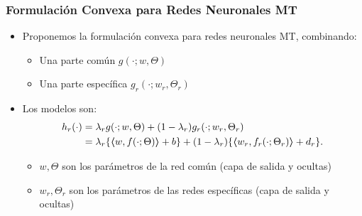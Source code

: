 \documentclass[aspectratio=43]{beamer}
\newcommand{\dotp}[2]{\bm{\left\langle} #1, #2 \bm{\right\rangle}}
\begin{document}
\begin{frame}
      \frametitle{Formulación Convexa para Redes Neuronales MT}

      \begin{itemize}
            \item Proponemos la formulación convexa para redes neuronales MT, combinando:
            \begin{itemize}
                  \item Una parte común $g(\cdot; w, \Theta)$
                  \item Una parte específica $g_r(\cdot; w_r, \Theta_r)$
            \end{itemize}
            \item Los modelos son:
            \begin{equation}
                  \nonumber
                  \begin{aligned}
                      h_r(\cdot) &= \lambda_r g(\cdot; w, \Theta) + (1 - \lambda_r) g_r(\cdot; w_r, \Theta_r)
                     \\&= \lambda_r \lbrace \dotp{w}{f(\cdot; \Theta)} + b \rbrace + (1 - \lambda_r) \lbrace \dotp{w_r}{f_r(\cdot; \Theta_r)} + d_r \rbrace.
                  \end{aligned} 
              \end{equation}
              \begin{itemize}
                  \item $w, \Theta$ son los parámetros de la red común (capa de salida y ocultas)
                  \item $w_r, \Theta_r$ son los parámetros de las redes específicas (capa de salida y ocultas)

              \end{itemize}
      \end{itemize}

\end{frame}

\begin{frame}

      

\end{frame}
\end{document}
